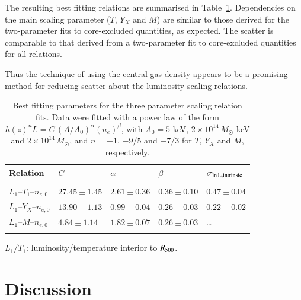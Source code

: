 \documentclass[oldversion]{aa}
\begin{document}
The resulting best fitting relations are summarised in Table~\ref{tab:3par}. Dependencies on the main scaling parameter ($T$, $Y_X$ and $M$) are similar to those derived for the two-parameter fits to core-excluded quantities, as expected. The scatter is comparable to that derived from a two-parameter fit to core-excluded quantities for all relations.

Thus the technique of using the central gas density  appears to be a promising method for reducing scatter about the luminosity scaling relations. 

\begin{table}
{\tiny 
\begin{minipage}{\columnwidth}
\caption{{\footnotesize Best fitting parameters for the three parameter scaling relation fits. 
Data were fitted with a power law of the form $h(z)^{n} L = C \, (A / A_0)^\alpha (n_e)^\beta$, with $A_0 = 5$ keV, $2 \times 10^{14}\, M_\odot$ keV and $2 \times 10^{14}\, M_\odot$, and $n=-1$, $-9/5$ and $-7/3$ for $T$, $Y_X$ and $M$, respectively. }}\label{tab:3par}
\centering
\begin{tabular}{l l l l l }
\hline
\hline
\multicolumn{1}{l}{Relation} & \multicolumn{1}{l}{$C$} & \multicolumn{1}{l}{$\alpha$} & \multicolumn{1}{l}{$\beta$} & \multicolumn{1}{l}{$\sigma_{\rm ln\,L,intrinsic}$} \\

\hline
\\
$L_1$--$T_1$--$n_{e,0}$ & $27.45\pm1.45$ & $2.61\pm0.36$ & $0.36\pm0.10$ & $0.47\pm0.04$\\

$L_1$--$Y_X$--$n_{e,0}$ & $13.90\pm1.13$ & $0.99\pm0.04$ & $0.26\pm0.03$ & $0.22\pm0.02$ \\

$L_1$--$M$--$n_{e,0}$ & $4.84\pm1.14$ & $1.82\pm0.07$ & $0.26\pm0.03$ & \ldots \\

\\
\hline
\end{tabular}
\end{minipage}
}
$L_1/T_1$: luminosity/temperature interior to $R_{500}$.
\end{table}



\section{Discussion}
\end{document}
